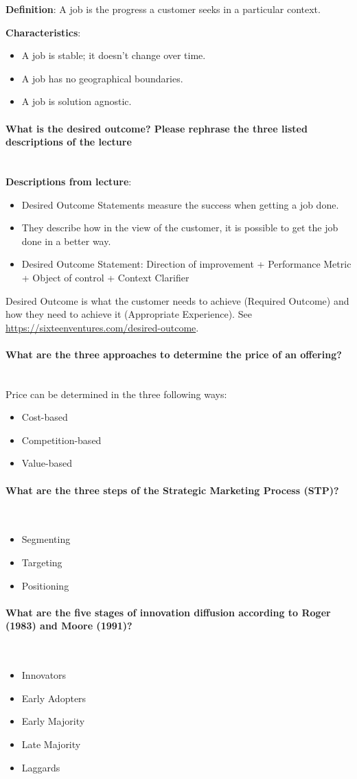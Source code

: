 \documentclass[10pt,a4paper,noendnumber=true]{scrartcl}
\newcommand{\properparagraph}[1]{\paragraph{\textcolor{Emerald}{#1}}\mbox{}\\}
\begin{document}
\textbf{Definition}: A job is the progress a customer seeks in a particular context.

\textbf{Characteristics}:
\begin{itemize}
	\item A job is stable; it doesn't change over time.
	\item A job has no geographical boundaries.
	\item A job is solution agnostic.
\end{itemize}

\properparagraph{What is the desired outcome? Please rephrase the three listed descriptions of the lecture}
\textbf{Descriptions from lecture}:
\begin{itemize}
	\item Desired Outcome Statements measure the success when getting a job done.
	\item They describe how in the view of the customer, it is possible to get the job done in a better way. 
	\item Desired Outcome Statement: Direction of improvement + Performance Metric + Object of control + Context Clarifier
\end{itemize}
 
Desired Outcome is what the customer needs to achieve (Required Outcome) and how they need to achieve it (Appropriate Experience). See \href{https://sixteenventures.com/desired-outcome}{https://sixteenventures.com/desired-outcome}.
\properparagraph{What are the three approaches to determine the price of an offering?}
Price can be determined in the three following ways:
\begin{itemize}
	\item Cost-based
	\item Competition-based
	\item Value-based
\end{itemize}
\properparagraph{What are the three steps of the Strategic Marketing Process (STP)?}
\begin{itemize}
	\item Segmenting
	\item Targeting
	\item Positioning
\end{itemize}

\properparagraph{What are the five stages of innovation diffusion according to Roger (1983) and Moore (1991)?}
\begin{itemize}
	\item Innovators
	\item Early Adopters
	\item Early Majority
	\item Late Majority
	\item Laggards
\end{itemize}
\end{document}
